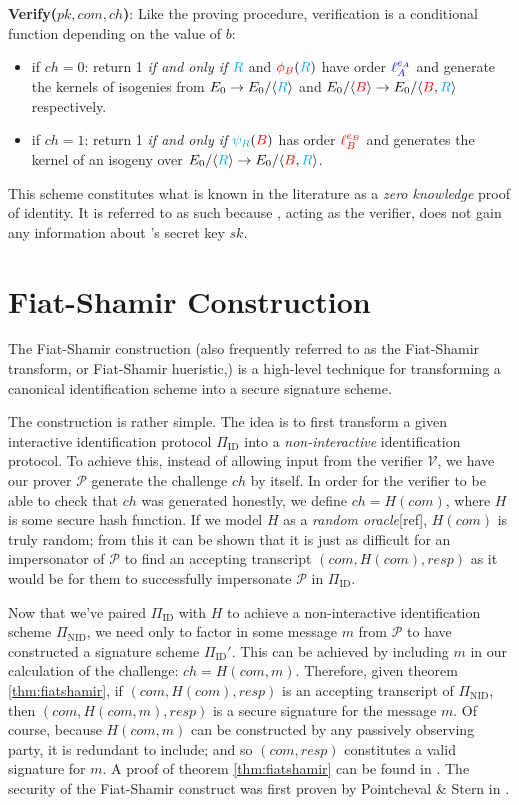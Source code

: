 \noindent
\textbf{Verify($pk, com, ch$)}: Like the proving procedure, verification is a conditional function depending on the value of $b$:
\begin{itemize}
\item if $ch = 0$: return 1 \emph{if and only if} $\textcolor{cyan}{R}$ and $\textcolor{red}{\phi_B}(\textcolor{cyan}{R})$ have order $\textcolor{blue}{\ell_{A}^{e_A}}$ and generate the kernels of isogenies from $E_0 \rightarrow E_0/\langle \textcolor{cyan}{R} \rangle$ and $E_0/\langle \textcolor{red}{B} \rangle \rightarrow E_0/\langle \textcolor{red}{B}, \textcolor{cyan}{R} \rangle$ respectively.
\item if $ch = 1$: return 1 \emph{if and only if} $\textcolor{cyan}{\psi_R}(\textcolor{red}{B})$ has order $\textcolor{red}{\ell_{B}^{e_B}}$ and generates the kernel of an isogeny over $E_0/\langle \textcolor{cyan}{R} \rangle \rightarrow E_0/\langle \textcolor{red}{B}, \textcolor{cyan}{R} \rangle$.
\end{itemize}

This scheme constitutes what is known in the literature as a \emph{zero knowledge} proof of identity. It is referred to as such because \alice, acting as the verifier, does not gain any information about \bob's secret key $sk$.

\section{Fiat-Shamir Construction}

The Fiat-Shamir construction (also frequently referred to as the Fiat-Shamir transform, or Fiat-Shamir hueristic,) is a high-level technique for transforming a canonical identification scheme into a secure  signature scheme.

The construction is rather simple. The idea is to first transform a given interactive identification protocol $\Pi_{\text{ID}}$ into a \emph{non-interactive} identification protocol. To achieve this, instead of allowing input from the verifier $\mathcal{V}$, we have our prover $\mathcal{P}$ generate the challenge $ch$ by itself. In order for the verifier to be able to check that $ch$ was generated honestly, we define $ch = H(com)$, where $H$ is some secure hash function. If we model $H$ as a \emph{random oracle}[ref], $H(com)$ is truly random; from this it can be shown that it is just as difficult for an impersonator of $\mathcal{P}$ to find an accepting transcript $(com, H(com), resp)$ as it would be for them to successfully impersonate $\mathcal{P}$ in $\Pi_{\text{ID}}$.

Now that we've paired $\Pi_{\text{ID}}$ with $H$ to achieve a non-interactive identification scheme $\Pi_{\text{NID}}$, we need only to factor in some message $m$ from $\mathcal{P}$ to have constructed a signature scheme $\Pi_{\text{ID}}'$. This can be achieved by including $m$ in our calculation of the challenge: $ch = H(com, m)$. Therefore, given theorem \ref{thm:fiatshamir}, if $(com, H(com), resp)$ is an accepting transcript of $\Pi_{\text{NID}}$, then $(com, H(com, m), resp)$ is a secure signature for the message $m$. Of course, because $H(com, m)$ can be constructed by any passively observing party, it is redundant to include; and so $(com,resp)$ constitutes a valid signature for $m$. A proof of theorem \ref{thm:fiatshamir} can be found in \cite{sigs}. The security of the Fiat-Shamir construct was first proven by Pointcheval \& Stern in \cite{fsproof}.

